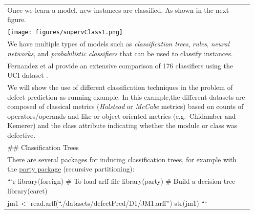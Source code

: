\documentclass[
]{book}
\begin{document}
\begin{longtable}[]{@{}
  >{\raggedleft\arraybackslash}p{}@{}}
Once we learn a model, new instances are classified. As shown in the next figure. \\
\texttt{[image: figures/supervClass1.png]} \\
We have multiple types of models such as \emph{classification trees}, \emph{rules}, \emph{neural networks}, and \emph{probabilistic classifiers} that can be used to classify instances. \\
Fernandez et al provide an extensive comparison of 176 classifiers using the UCI dataset \citep{FernandezCBA14}. \\
We will show the use of different classification techniques in the problem of defect prediction as running example. In this example,the different datasets are composed of classical metrics (\emph{Halstead} or \emph{McCabe} metrics) based on counts of operators/operands and like or object-oriented metrics (e.g.~Chidamber and Kemerer) and the class attribute indicating whether the module or class was defective. \\
\#\# Classification Trees \\
There are several packages for inducing classification trees, for example with the \href{https://cran.r-project.org/web/packages/party/index.html}{party package} (recursive partitioning): \\
```r
library(foreign) \# To load arff file
library(party) \# Build a decision tree
library(caret) \\
jm1 \textless- read.arff(``./datasets/defectPred/D1/JM1.arff'')
str(jm1)
``` \\

\end{longtable}
\end{document}
